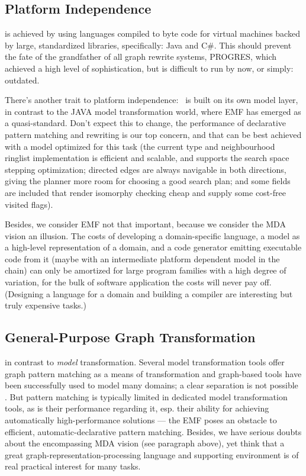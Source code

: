 \subsection*{Platform Independence}
is achieved by using languages compiled to byte code for virtual machines backed by large, standardized libraries, specifically: Java and C\#.
This should prevent the fate of the grandfather of all graph rewrite systems, PROGRES\cite{schuerr99progres},
which achieved a high level of sophistication, but is difficult to run by now, or simply: outdated.

There's another trait to platform independence: \GrG\ is built on its own model layer, in contrast to the JAVA model transformation world, where EMF has emerged as a quasi-standard.
Don't expect this to change, the performance of declarative pattern matching and rewriting is our top concern, and that can be best achieved with a model optimized for this task (the current type and neighbourhood ringlist implementation is efficient and scalable, and supports the search space stepping optimization; directed edges are always navigable in both directions, giving the planner more room for choosing a good search plan; and some fields are included that render isomorphy checking cheap and supply some cost-free visited flags).

Besides, we consider EMF not that important, because we consider the MDA vision an illusion.
The costs of developing a domain-specific language, a model as a high-level representation of a domain, and a code generator emitting executable code from it (maybe with an intermediate platform dependent model in the chain) can only be amortized for large program families with a high degree of variation, for the bulk of software application the costs will never pay off.
(Designing a language for a domain and building a compiler are interesting but truly expensive tasks.)

\subsection*{General-Purpose Graph Transformation}
in contrast to \emph{model} transformation.
Several model transformation tools offer graph pattern matching as a means of transformation and graph-based tools have been successfully used to model many domains; a clear separation is not possible \cite{Jakumeit2013}.
But pattern matching is typically limited in dedicated model transformation tools, as is their performance regarding it, esp. their ability for achieving automatically high-performance solutions --- the EMF poses an obstacle to efficient, automatic-declarative pattern matching.
Besides, we have serious doubts about the encompassing MDA vision (see paragraph above), yet think that a great graph-representation-processing language and supporting environment is of real practical interest for many tasks.

